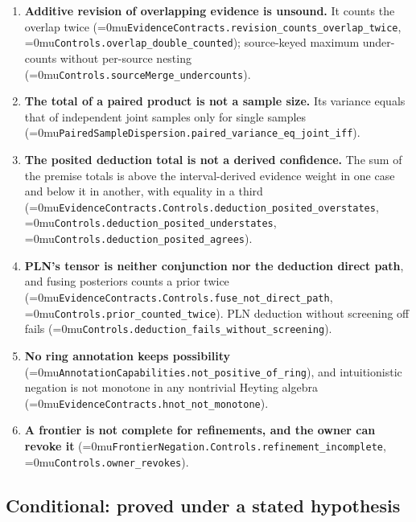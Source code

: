 \documentclass[11pt]{article}
\newcommand{\leanname}[1]{\textup{\Urlmuskip=0mu\relax\nolinkurl{#1}}}
\theoremstyle{definition}
\theoremstyle{remark}
\begin{document}
\begin{enumerate}
  (\leanname{SoundStage.not_proves_own_consistency}), no sound stage contains its
  zoom-out (\leanname{SoundStage.not_next_le}), and none proves every truth of
  $\mathbb N$ (\leanname{truth_not_reached}).  The $\Delta_1$ condition is
  necessary: true arithmetic satisfies every other condition and has no
  $\Delta_1$ presentation (\leanname{trueArith_not_delta1}).
\item \textbf{Additive revision of overlapping evidence is unsound.}  It counts
  the overlap twice (\leanname{EvidenceContracts.revision_counts_overlap_twice},
  \leanname{Controls.overlap_double_counted}); source-keyed maximum
  under-counts without per-source nesting
  (\leanname{Controls.sourceMerge_undercounts}).
\item \textbf{The total of a paired product is not a sample size.}  Its
  variance equals that of independent joint samples only for single samples
  (\leanname{PairedSampleDispersion.paired_variance_eq_joint_iff}).
\item \textbf{The posited deduction total is not a derived confidence.}  The
  sum of the premise totals is above the interval-derived evidence weight in
  one case and below it in another, with equality in a third
  (\leanname{EvidenceContracts.Controls.deduction_posited_overstates},
  \leanname{Controls.deduction_posited_understates},
  \leanname{Controls.deduction_posited_agrees}).
\item \textbf{PLN's tensor is neither conjunction nor the deduction direct
  path}, and fusing posteriors counts a prior twice
  (\leanname{EvidenceContracts.Controls.fuse_not_direct_path},
  \leanname{Controls.prior_counted_twice}).  PLN deduction without screening
  off fails (\leanname{Controls.deduction_fails_without_screening}).
\item \textbf{No ring annotation keeps possibility}
  (\leanname{AnnotationCapabilities.not_positive_of_ring}), and intuitionistic
  negation is not monotone in any nontrivial Heyting algebra
  (\leanname{EvidenceContracts.hnot_not_monotone}).
\item \textbf{A frontier is not complete for refinements, and the owner can
  revoke it} (\leanname{FrontierNegation.Controls.refinement_incomplete},
  \leanname{Controls.owner_revokes}).
\end{enumerate}

\subsection{Conditional: proved under a stated hypothesis}
\end{document}
